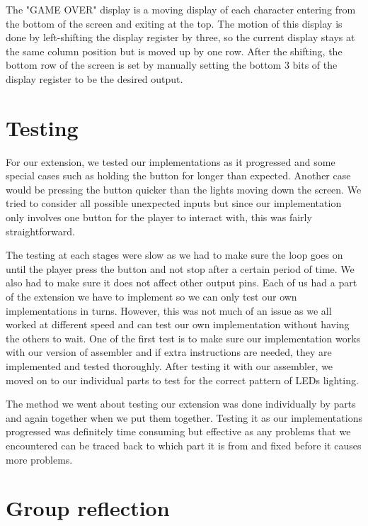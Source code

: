 \documentclass[11pt]{article}
\begin{document}
\medskip

The "GAME OVER" display is a moving display of each character entering from the bottom of the screen and exiting at the top. The motion of this display is done by left-shifting the display register by three, so the current display stays at the same column position but is moved up by one row. After the shifting, the bottom row of the screen is set by manually setting the bottom 3 bits of the display register to be the desired output. 

\medskip

\section{Testing}

For our extension, we tested our implementations as it progressed and some special cases such as holding the button for longer than expected. Another case would be pressing the button quicker than the lights moving down the screen. We tried to consider all possible unexpected inputs but since our implementation only involves one button for the player to interact with, this was fairly straightforward.

\medskip

The testing at each stages were slow as we had to make sure the loop goes on until the player press the button and not stop after a certain period of time. We also had to make sure it does not affect other output pins. Each of us had a part of the extension we have to implement so we can only test our own implementations in turns. However, this was not much of an issue as we all worked at different speed and can test our own implementation without having the others to wait. One of the first test is to make sure our implementation works with our version of assembler and if extra instructions are needed, they are implemented and tested thoroughly. After testing it with our assembler, we moved on to our individual parts to test for the correct pattern of LEDs lighting.

\medskip

The method we went about testing our extension was done individually by parts and again together when we put them together. Testing it as our implementations progressed was definitely time consuming but effective as any problems that we encountered can be traced back to which part it is from and fixed before it causes more problems. 

\section{Group reflection}
\end{document}
